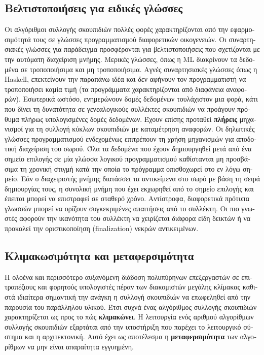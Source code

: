\begin{greek}
\subsection{Βελτιστοποιήσεις για ειδικές γλώσσες}
Οι αλγόριθμοι συλλογής σκουπιδιών πολλές φορές χαρακτηρίζονται
από την εφαρμοσιμότητά τους σε γλώσσες προγραμματισμού διαφορετικών
οικογενειών. Οι συναρτησιακές γλώσσες για παράδειγμα προσφέρονται
για βελτιστοποιήσεις που σχετίζονται με την αυτόματη διαχείριση
μνήμης. Μερικές γλώσσες, όπως η ML διακρίνουν τα δεδομένα σε
τροποποιήσιμα και μη τροποποιήσιμα. Αγνές συναρτησιακές γλώσσες
όπως η Haskell, επεκτείνουν την παραπάνω ιδέα και δεν αφήνουν
τον προγραμματιστή να τροποποιήσει καμία τιμή (τα προγράμματα
χαρακτηρίζονται από διαφάνεια αναφορών). Εσωτερικά ωστόσο, ενημερώνουν
δομές δεδομένων τουλάχιστον μια φορά, κάτι που δίνει τη δυνατότητα
σε γενεαλογικούς συλλέκτες σκουπιδιών να προάγουν πρόθυμα πλήρως
υπολογισμένες δομές δεδομένων. Έχουν επίσης προταθεί \textbf{πλήρεις}
μηχανισμοί για τη συλλογή κύκλων σκουπιδιών με καταμέτρηση αναφορών.
Οι δηλωτικές γλώσσες προγραμματισμού ενδεχομένως επιτρέπουν τη
χρήση μηχανισμών για αποδοτική διαχείριση του σωρού. Όλα τα δεδομένα
που έχουν δημιουργηθεί μετά από ένα σημείο επιλογής σε μία γλώσσα
λογικού προγραμματισμού καθίστανται μη προσβάσιμα τη χρονική
στιγμή κατά την οποία το πρόγραμμα οπισθοχωρεί στο εν λόγω σημείο.
Εάν ο διαχειριστής μνήμης διατάσσει τα αντικείμενα στο σωρό με
βάση τη σειρά δημιουργίας τους, η συνολική μνήμη που έχει εκχωρηθεί
από το σημείο επιλογής και έπειται μπορεί να επιστραφεί σε σταθερό
χρόνο. Αντίστροφα, διαφορετικά πρότυπα γλωσσών μπορεί να ορίζουν
συγκεκριμένες απαιτήσεις από το συλλέκτη. Οι πιο γνωστές αφορούν
την ικανότητα του συλλέκτη να χειρίζεται διάφορα είδη δεικτών
ή να προκαλεί την οριστικοποίηση (finalization) νεκρών αντικειμένων. 

\subsection{Κλιμακωσιμότητα και μεταφερσιμότητα}
Η ολοένα και περισσότερο αυξανόμενη διάδοση πολυπύρηνων επεξεργαστών
σε επιτραπέζιους και φορητούς υπολογιστές πέραν των διακομιστών
μεγάλης κλίμακας καθιστά ιδιαίτερα σημαντική την ανάγκη η συλλογή
σκουπιδιών να επωφεληθεί από την παρουσία του παράλληλου υλικού.
Έτσι συχνά ένας αλγόριθμος συλλογής σκουπιδιών χαρακτηρίζεται
ως προς το πώς \textbf{κλιμακώνει}. Η λειτουργία ενός αριθμού
αλγορίθμων συλλογής σκουπιδιών εξαρτάται από την υποστήριξη που
παρέχει το λειτουργικό σύστημα και η αρχιτεκτονική. Αυτό έχει
ως αποτέλεσμα η \textbf{μεταφερσιμότητα} των αλγορίθμων να μην
είναι απαραίτητα εγγυημένη.


\end{greek}
